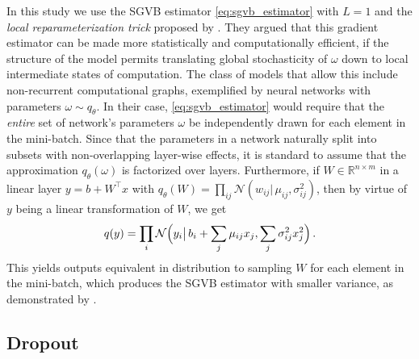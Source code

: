 \documentclass{article}
\begin{document}
In this study we use the SGVB estimator \eqref{eq:sgvb_estimator} with $L=1$ and the
\emph{local reparameterization trick} proposed by \citet{kingma_variational_2015}. They
argued that this gradient estimator can be made more statistically and computationally
efficient, if the structure of the model permits translating global stochasticity of
$\omega$ down to local intermediate states of computation.
%
The class of models that allow this include non-recurrent computational graphs,
exemplified by neural networks with parameters $\omega \sim q_\theta$. In their case,
\eqref{eq:sgvb_estimator} would require that the \emph{entire} set of network's parameters
$\omega$ be independently drawn for each element in the mini-batch. Since that the
parameters in a network naturally split into subsets with non-overlapping layer-wise
effects, it is standard to assume that the approximation $
  q_\theta(\omega)
$ is factorized over layers. Furthermore, if $
  W \in \mathbb{R}^{n\times m}
$ in a linear layer $
  y = b + W^\top x
$ with $
  q_\theta(W)
    = \prod_{ij}
      \mathcal{N}(w_{ij} \vert\, \mu_{ij}, \sigma_{ij}^2)
$, then by virtue of $y$ being a linear transformation of $W$, we get
\begin{equation}  \label{eq:r-gauss-trick}
  q(y) = \prod_i \mathcal{N}\Bigl(
        y_i \big\vert\,
        b_i + \sum_j \mu_{ij} x_j,
        \sum_j \sigma^2_{ij} x_j^2
    \Bigr)
  \,.
\end{equation}
This yields outputs equivalent in distribution to sampling $W$ for each element in
the mini-batch, which produces the SGVB estimator with smaller variance, as demonstrated
by \citet{kingma_variational_2015}.


\subsection{Dropout} %
\label{sub:dropout}
\end{document}
